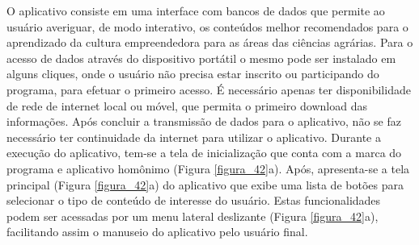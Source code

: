 O aplicativo consiste em uma interface com bancos de dados que permite ao usuário averiguar, de modo interativo, os conteúdos melhor recomendados para o aprendizado da cultura empreendedora para as áreas das ciências agrárias. 
Para o acesso de dados através do dispositivo portátil o mesmo pode ser instalado em alguns cliques, onde o usuário não precisa estar inscrito ou participando do programa, para efetuar o primeiro acesso. É necessário apenas ter disponibilidade de rede de internet local ou móvel, que permita o primeiro download das informações. Após concluir a transmissão de dados para o aplicativo, não se faz necessário ter continuidade da internet para utilizar o aplicativo. 
Durante a execução do aplicativo, tem-se a tela de inicialização que conta com a marca do programa e aplicativo homônimo (Figura \ref{figura_42}a). 
Após, apresenta-se a tela principal (Figura \ref{figura_42}a) do aplicativo que exibe uma lista de botões para selecionar o tipo de conteúdo de interesse do usuário. Estas funcionalidades podem ser acessadas por um menu lateral deslizante (Figura \ref{figura_42}a), facilitando assim o manuseio do aplicativo pelo usuário final. 


